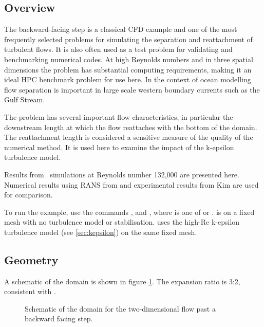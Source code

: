 \subsection{Overview}
The backward-facing step is a classical CFD example and one of the most frequently selected
problems for simulating the separation and reattachment of turbulent flows.
It is also often used as a test problem for validating and benchmarking numerical codes.
At high Reynolds numbers and in three spatial dimensions the problem has substantial
computing requirements, making it an ideal HPC benchmark problem for use here.
In the context of ocean modelling flow separation is important
in large scale western boundary currents such as the Gulf Stream.

The problem has several important flow characteristics,
in particular the downstream length at which the flow reattaches with the bottom of the domain. 
The reattachment length is considered a sensitive measure of the quality of the numerical method.
It is used here to examine the impact of the k-epsilon turbulence model.

Results from \fluidity\ simulations at Reynolds number 132,000
are presented here. Numerical results using RANS from \cite{ilinca_97}
and experimental results from Kim \cite{ilinca_97} are used for comparison.

To run the example, use the commands , 
and , where  is one of  or
.  is on a fixed mesh with no turbulence model
or stabilisation.  uses the high-Re k-epsilon turbulence model (see \ref{sec:kepsilon})
on the same fixed mesh.

\subsection{Geometry}
A schematic of the domain is shown in figure \ref{Fig:Schematic2d}.
The expansion ratio is 3:2, consistent with \cite{ilinca_97}.

\begin{figure}
\centering
{}
\caption{Schematic of the domain for the two-dimensional flow past a backward facing step.}
\label{Fig:Schematic2d}
\end{figure}


